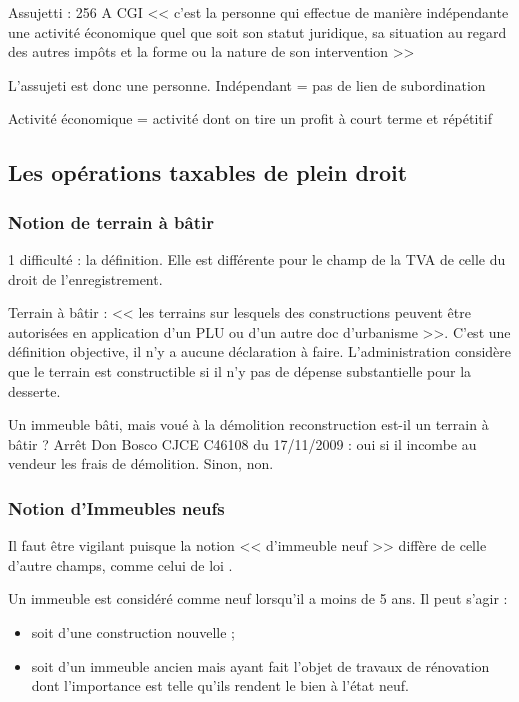 	Assujetti : 256 A CGI << c’est la personne qui effectue de manière indépendante une activité économique quel que soit son statut juridique, sa situation au regard des autres impôts et la forme ou la nature de son intervention >>


	L'assujeti est donc une personne. Indépendant = pas de lien de subordination


	Activité économique = activité dont on tire un profit à court terme et répétitif


	\subsection{Les opérations taxables de plein droit}

		\subsubsection{Notion de terrain à bâtir}

			1\iere{} difficulté : la définition. Elle est différente pour le champ de la TVA de celle du droit de l’enregistrement.

			Terrain à bâtir : << les terrains sur lesquels des constructions peuvent être autorisées en application d’un PLU ou d’un autre doc d’urbanisme >>.
			C’est une définition objective, il n’y a aucune déclaration à faire. L’administration considère que le terrain est constructible si il n’y pas de dépense substantielle pour la desserte.


			Un immeuble bâti, mais voué à la démolition reconstruction est-il un terrain à bâtir ? Arrêt Don Bosco CJCE C46108 du 17/11/2009 : oui si il incombe au vendeur les frais de démolition. Sinon, non.


		\subsubsection{Notion d’Immeubles neufs }

			Il faut être vigilant puisque la notion << d'immeuble neuf >> diffère de celle d'autre champs, comme celui de loi .

			Un immeuble est considéré comme neuf lorsqu'il a moins de 5 ans.
			Il peut s'agir :
			\begin{itemize}
				\item soit d'une construction nouvelle ;
				\item soit d'un immeuble ancien mais ayant fait l'objet de travaux de rénovation dont l'importance est telle qu'ils rendent le bien à l'état neuf.
			\end{itemize}

